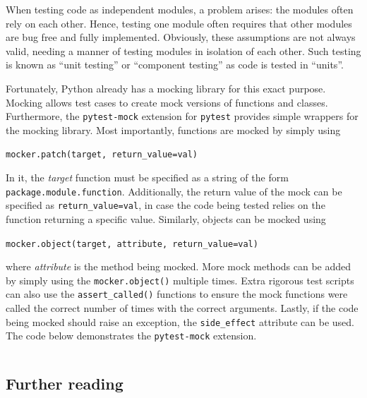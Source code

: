 \documentclass[11pt]{article}
\begin{document}
When testing code as independent modules, a problem arises: the modules often rely on each other. Hence, testing one module often requires that other modules are bug free and fully implemented. Obviously, these assumptions are not always valid, needing a manner of testing modules in isolation of each other. Such testing is known as ``unit testing'' or ``component testing'' as code is tested in ``units''.

Fortunately, Python already has a mocking library for this exact purpose. Mocking allows test cases to create mock versions of functions and classes. Furthermore, the \texttt{pytest-mock} extension for \texttt{pytest} provides simple wrappers for the mocking library. Most importantly, functions are mocked by simply using

\vspace{\baselineskip}
\texttt{mocker.patch(target, return_value=val)}

\vspace{\baselineskip}

\noindent
In it, the \textit{target} function must be specified as a string of the form \texttt{package.module.function}. Additionally, the return value of the mock can be specified as \texttt{return_value=val}, in case the code being tested relies on the function returning a specific value. Similarly, objects can be mocked using

\vspace{\baselineskip}
\noindent
\texttt{mocker.object(target, attribute, return_value=val)}
\vspace{\baselineskip}

\noindent
where \textit{attribute} is the method being mocked. More mock methods can be added by simply using the \texttt{mocker.object()} multiple times. Extra rigorous test scripts can also use the \texttt{assert_called()} functions to ensure the mock functions were called the correct number of times with the correct arguments. Lastly, if the code being mocked should raise an exception, the \texttt{side_effect} attribute can be used. The code below demonstrates the \texttt{pytest-mock} extension.

\inputminted[]{python}{python_examples/pytest-mock_example.py}

\subsection{Further reading}
\end{document}
